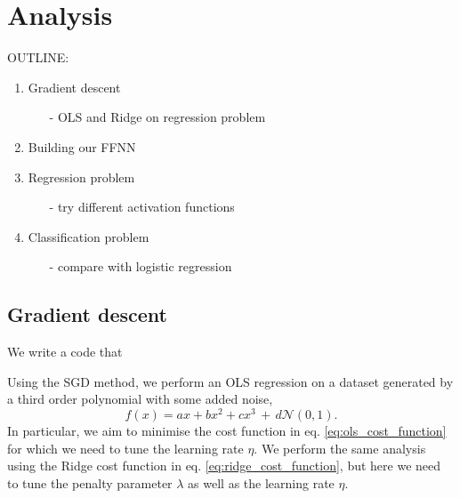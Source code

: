 \section{Analysis}\label{sec:analysis}





OUTLINE:
\begin{enumerate}
    \item Gradient descent \begin{enumerate}
        \item[-] OLS and Ridge on regression problem
    \end{enumerate}
    \item Building our FFNN
    \item Regression problem \begin{enumerate}
        \item[-] try different activation functions
    \end{enumerate}
    \item Classification problem \begin{enumerate}
        \item[-] compare with logistic regression 
    \end{enumerate}
\end{enumerate}

\subsection{Gradient descent}

    We write a code that  \fillertext


    Using the SGD method, we perform an OLS regression on a dataset generated by a third order polynomial with some added noise,
    \begin{equation}
        f(x) = ax + bx^2 + cx^3 \, +\, d\mathcal{N}(0, 1). %
    \end{equation}
    In particular, we aim to minimise the cost function in eq. \eqref{eq:ols_cost_function} for which we need to tune the learning rate $\eta$. We perform the same analysis using the Ridge cost function in eq. \eqref{eq:ridge_cost_function}, but here we need to tune the penalty parameter $\lambda$ as well as the learning rate $\eta$. 

